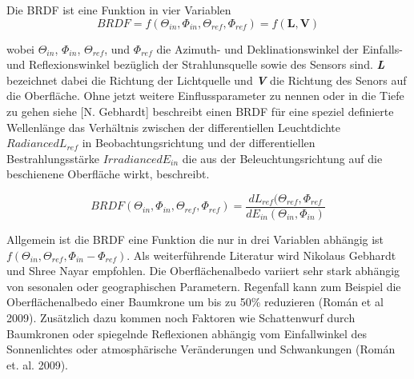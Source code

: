 \documentclass[11pt]{report}
\begin{document}
Die BRDF ist eine Funktion in vier Variablen
\begin{equation}
BRDF = f(\Theta_{in},\Phi_{in},\Theta_{ref},\Phi_{ref}) = f(\mathbf{L},\mathbf{V})
\end{equation}\newline

wobei $\Theta_{in}$, $\Phi_{in}$, $ \Theta_{ref}$, und $\Phi_{ref}$ die Azimuth- und Deklinationswinkel der Einfalls- und Reflexionswinkel bezüglich der Strahlunsquelle sowie des Sensors sind.  \textbf{\emph{L}} bezeichnet dabei die Richtung der Lichtquelle und \textbf{\emph{V}} die Richtung des Senors auf die Oberfläche. Ohne jetzt weitere Einflussparameter zu nennen oder in die Tiefe zu gehen  siehe [N. Gebhardt] beschreibt einen BRDF für eine speziel definierte Wellenlänge das Verhältnis zwischen der differentiellen Leuchtdichte \textbf{\emph{$ Radiance dL_{ref}$}} in Beobachtungsrichtung und der differentiellen Bestrahlungsstärke \textbf{\emph{$ Irradiance dE_{in}$}} die aus der Beleuchtungsrichtung auf die beschienene Oberfläche wirkt, beschreibt.

\begin{equation}
BRDF(\Theta_{in},\Phi_{in},\Theta_{ref},\Phi_{ref}) = \frac{dL_{ref}(\Theta_{ref},\Phi_{ref}}{dE_{in}(\Theta_{in},\Phi_{in})}
\end{equation}
\newline


Allgemein ist die BRDF eine Funktion die nur in drei Variablen abhängig ist $f(\Theta_{in},\Theta_{ref},\Phi_{in}-\Phi_{ref}) $. Als weiterführende Literatur wird Nikolaus Gebhardt und Shree Nayar empfohlen.
\newline
Die Oberflächenalbedo variiert sehr stark abhängig von sesonalen oder geographischen Parametern. Regenfall kann zum Beispiel die Oberflächenalbedo einer Baumkrone um bis zu 50\% reduzieren (Román et al 2009). Zusätzlich dazu kommen noch Faktoren wie Schattenwurf durch Baumkronen oder spiegelnde Reflexionen abhängig vom Einfallwinkel des Sonnenlichtes oder atmosphärische Veränderungen und Schwankungen (Román et. al. 2009).\newline

\end{document}
